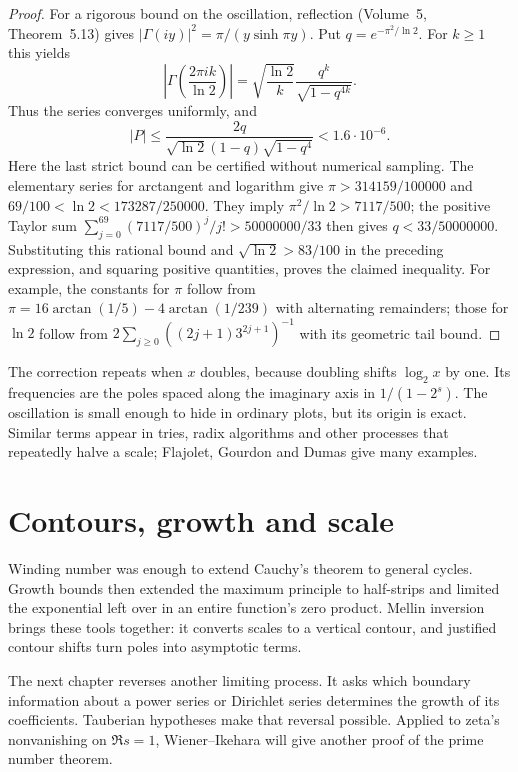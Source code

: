 \begin{proof}
For a rigorous bound on the oscillation, reflection (Volume~5, Theorem~5.13) gives $|\Gamma(iy)|^2=\pi/(y\sinh\pi y)$. Put $q=e^{-\pi^2/\ln2}$. For $k\ge1$ this yields
\[\left|\Gamma\left(\frac{2\pi ik}{\ln2}\right)\right|
 =\sqrt{\frac{\ln2}{k}}\frac{q^k}{\sqrt{1-q^{4k}}}.
\]
Thus the series converges uniformly, and
\[|P|\le\frac{2q}{\sqrt{\ln2}(1-q)\sqrt{1-q^4}}<1.6\cdot10^{-6}.
\]
Here the last strict bound can be certified without numerical sampling. The elementary series for arctangent and logarithm give $\pi>314159/100000$ and $69/100<\ln2<173287/250000$. They imply $\pi^2/\ln2>7117/500$; the positive Taylor sum $\sum_{j=0}^{69}(7117/500)^j/j!>50000000/33$ then gives $q<33/50000000$. Substituting this rational bound and $\sqrt{\ln2}>83/100$ in the preceding expression, and squaring positive quantities, proves the claimed inequality. For example, the constants for $\pi$ follow from $\pi=16\arctan(1/5)-4\arctan(1/239)$ with alternating remainders; those for $\ln2$ follow from $2\sum_{j\ge0}((2j+1)3^{2j+1})^{-1}$ with its geometric tail bound.
\end{proof}

\begin{beauty}
The correction repeats when $x$ doubles, because doubling shifts $\log_2x$ by one. Its frequencies are the poles spaced along the imaginary axis in $1/(1-2^s)$. The oscillation is small enough to hide in ordinary plots, but its origin is exact. Similar terms appear in tries, radix algorithms and other processes that repeatedly halve a scale; Flajolet, Gourdon and Dumas give many examples.
\end{beauty}

\section{Contours, growth and scale}

Winding number was enough to extend Cauchy's theorem to general cycles. Growth bounds then extended the maximum principle to half-strips and limited the exponential left over in an entire function's zero product. Mellin inversion brings these tools together: it converts scales to a vertical contour, and justified contour shifts turn poles into asymptotic terms.

The next chapter reverses another limiting process. It asks which boundary information about a power series or Dirichlet series determines the growth of its coefficients. Tauberian hypotheses make that reversal possible. Applied to zeta's nonvanishing on $\Re s=1$, Wiener--Ikehara will give another proof of the prime number theorem.


